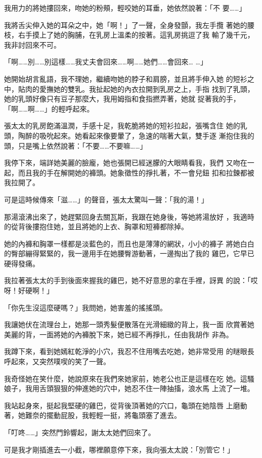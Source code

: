 我用力的將她摟回來，吻她的粉頰，輕咬她的耳垂，她依然說著：「不
要……」

我將舌尖伸入她的耳朵之中，她「啊！」了一聲，全身發顫，我左手攬
著她的腰枝，右手摸上了她的胸脯，在乳房上溫柔的按著。這乳房挑逗了我
輸了幾千元，我非討回來不可。

「啊……別……別這樣……我丈夫會回來……啊……她們……會回來…
…」

她開始胡言亂語，我不理她，繼續吻她的脖子和肩膀，並且將手伸入她
的短衫之中，貼肉的愛撫她的雙乳。我扯起她的內衣拉開到乳房之上，手指
找到了乳頭，她的乳頭好像只有豆子那麼大，我用姆指和食指撚弄著，她就
捉著我的手，「啊……啊……」的輕呼起來。

張太太的乳房飽滿溫潤，手感十足，我乾脆將她的短衫拉起，張嘴含住
她的乳頭，陶醉的吸吮起來。她看起來像要暈了，急速的喘著大氣，雙手逐
漸抱住我的頭，只是嘴上依然說著：「不要……不要嘛……」

我停下來，端詳她美麗的臉龐，她也張開已經迷朦的大眼睛看我，我們
又吻在一起，而且我的手在解開她的褲頭。她象徵性的掙扎著，不一會兒鈕
扣和拉鍊都被我拉開了。

可是這時候傳來「滋……」的聲音，張太太驚叫一聲：「我的湯！」

那湯滾沸出來了，她趕緊回身去關瓦斯，我跟在她身後，等她將湯放好
，我適時的從背後摟抱住她，並且將她的上衣、胸罩和短褲都除掉。

她的內褲和胸罩一樣都是淡藍色的，而且也是薄薄的網狀，小小的褲子
將她白白的臀部繃得緊緊的，我一邊用手在她腰臀游動著，一邊掏出了我的
雞巴，它早已硬得發痛。

我拉著張太太的手到後面來握我的雞巴，她不好意思的拿在手裡，訝異
的說：「哎呀！好硬啊！」

「你先生沒這麼硬嗎？」我問她，她害羞的搖搖頭。

我讓她伏在流理台上，她那一頭秀髮便散落在光滑細緻的背上，我一面
欣賞著她美麗的背，一面將她的內褲脫下來，她已經不再掙扎，任由我胡作
非為。

我蹲下來，看到她嫣紅乾淨的小穴，我忍不住用嘴去吃她，她非常受用
的瞇眼長呼起來，又突然噗喫的笑了一聲。

我奇怪她在笑什麼，她說原來在我們來她家前，她老公也正是這樣在吃
她。這騷娘子，我用舌頭狠狠的伸進她的穴中，她忍不住一陣抽搐，浪水馬
上流了一堆。

我站起身來，挺起我堅硬的雞巴，從背後頂著她的穴口，龜頭在她陰唇
上磨動著，她難奈的擺動屁股，我輕輕一挺，將龜頭塞了進去。

「叮咚……」突然門鈴響起，謝太太她們回來了。

可是我才剛插進去一小截，哪裡願意停下來，我向張太太說：「別管它！」

